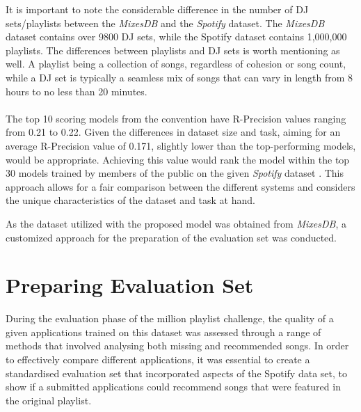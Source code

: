 It is important to note the considerable difference in the number of DJ sets/playlists between the \textit{MixesDB} and the \textit{Spotify} dataset. The \textit{MixesDB} dataset contains over 9800 DJ sets, while the Spotify dataset contains 1,000,000 playlists. The differences between playlists and DJ sets is worth mentioning as well. A playlist being a collection of songs, regardless of cohesion or song count, while a DJ set is typically a seamless mix of songs that can vary in length from 8 hours to no less than 20 minutes.
\\
\\
The top 10 scoring models from the convention have R-Precision values ranging from 0.21 to 0.22. Given the differences in dataset size and task, aiming for an average R-Precision value of 0.171, slightly lower than the top-performing models, would be appropriate. Achieving this value would rank the model within the top 30 models trained by members of the public on the given \textit{Spotify} dataset \citep{aicrowd_aicrowd_2023}. This approach allows for a fair comparison between the different systems and considers the unique characteristics of the dataset and task at hand. 

As the dataset utilized with the proposed model was obtained from \textit{MixesDB}, a customized approach for the preparation of the evaluation set was conducted.

\section{Preparing Evaluation Set}
During the evaluation phase of the million playlist challenge, the quality of a given applications trained on this dataset was assessed through a range of methods that involved analysing both missing and recommended songs. In order to effectively compare different applications, it was essential to create a standardised evaluation set that incorporated aspects of the Spotify data set, to show if a submitted applications could recommend songs that were featured in the original playlist.

